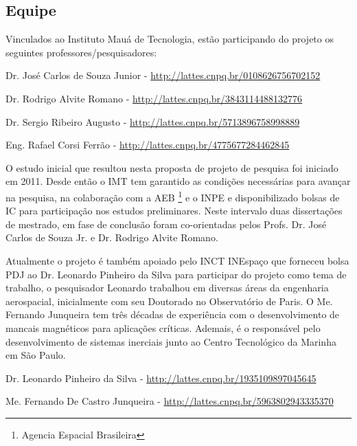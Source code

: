 
\subsection{Equipe}

Vinculados ao Instituto Mauá de Tecnologia, estão participando do projeto os seguintes professores/pesquisadores:

\begin{compactitem}
\item Dr. José Carlos de Souza Junior - 	\url{http://lattes.cnpq.br/0108626756702152}
\item Dr. Rodrigo Alvite Romano - 		\url{http://lattes.cnpq.br/3843114488132776}
\item Dr. Sergio Ribeiro Augusto - 		\url{http://lattes.cnpq.br/5713896758998889}
\item Eng. Rafael Corsi Ferrão - 		\url{http://lattes.cnpq.br/4775677284462845}
\end{compactitem}

O estudo inicial que resultou nesta proposta de projeto de pesquisa foi iniciado em 2011. Desde então o IMT tem garantido as condições necessárias para avançar na pesquisa, na colaboração com a AEB \footnote{Agencia Espacial Brasileira} e o INPE e disponibilizado bolsas de IC para participação nos estudos preliminares. Neste intervalo duas dissertações de mestrado, em fase de conclusão foram co-orientadas pelos Profs. Dr. José Carlos de Souza Jr. e Dr. Rodrigo Alvite Romano.
 
Atualmente o projeto é também apoiado pelo INCT INEspaço que forneceu bolsa PDJ ao Dr. Leonardo Pinheiro da Silva para participar do projeto como tema de trabalho, o pesquisador Leonardo trabalhou em diversas áreas da engenharia aerospacial, inicialmente com seu Doutorado no Observatório de Paris. O Me. Fernando Junqueira  tem três décadas de experiência com o desenvolvimento de mancais magnéticos para aplicações críticas. Ademais, é o responsável pelo desenvolvimento de sistemas inerciais junto ao Centro Tecnológico da Marinha em São Paulo. 

\begin{compactitem}
	\item Dr. Leonardo Pinheiro da Silva -  \url{http://lattes.cnpq.br/1935109897045645}
	\item Me. Fernando De Castro Junqueira - 			\url{http://lattes.cnpq.br/5963802943335370}
\end{compactitem}

